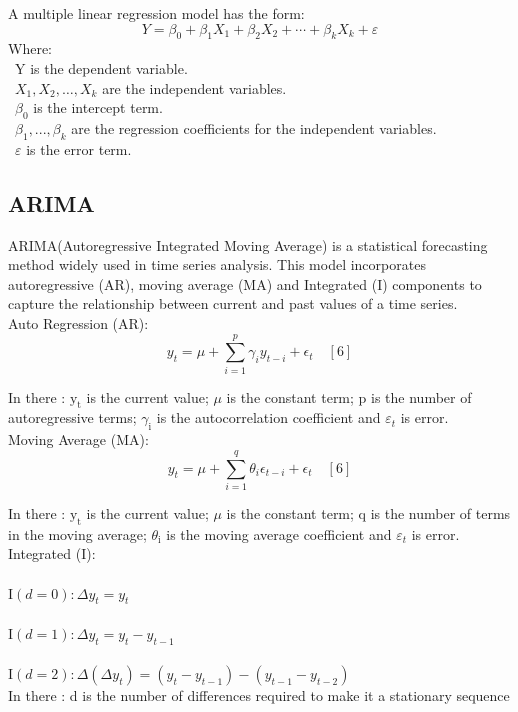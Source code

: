\documentclass{ieeeojies}
\begin{document}
A multiple linear regression model has the form: 
\[Y=\beta_0+\beta_1X_1+\beta_2X_2+\cdots+\beta_kX_k+\varepsilon\]
Where:\\
	\indent\textbullet\ Y is the dependent variable.\\
	\indent\textbullet\ \(X_1, X_2, \ldots, X_k\) are the independent variables.\\
	\indent\textbullet\ \(\beta_0\) is the intercept term.\\
	\indent\textbullet\ \(\beta_1,..., \beta_k\) are the regression coefficients for the independent variables.\\
	\indent\textbullet\ \(\varepsilon\) is the error term.
 \subsection{ARIMA}
 ARIMA(Autoregressive Integrated Moving Average) is a statistical forecasting method widely used in time series analysis. This model incorporates autoregressive (AR), moving average (MA) and Integrated (I) components to capture the relationship between current and past values of a time series.\\
Auto Regression (AR): 
$$
y_t=\mu+\sum_{i=1}^p \gamma_i y_{t-i}+\epsilon_t \quad [6]
$$

In there : $\mathrm{y}_{\mathrm{t}}$ is the current value; $\mu$ is the constant term; $\mathrm{p}$ is the number of autoregressive terms; $\gamma_{\mathrm{i}}$ is the autocorrelation coefficient and $\varepsilon_{t}$ is error.\\
Moving Average (MA):
$$
y_t=\mu+\sum_{i=1}^q \theta_i \epsilon_{t-i}+\epsilon_t \quad [6]
$$

In there : $\mathrm{y}_{\mathrm{t}}$ is the current value; $\mu$ is the constant term; $\mathrm{q}$ is the number of terms in the moving average; $\theta_{\mathrm{i}}$ is the moving average coefficient  and $\varepsilon_{t}$ is error.\\
Integrated (I):\\
 \\$\mathrm{I}(d=0): \Delta y_t=y_t$\\
 \\$\mathrm{I}(d=1): \Delta y_t=y_t-y_{t-1}$\\
 \\$\mathrm{I}(d=2): \Delta\left(\Delta y_t\right)=\left(y_t-y_{t-1}\right)-\left(y_{t-1}-y_{t-2}\right)$ \\
 
In there : d is the number of differences required to make it a stationary sequence 
\end{document}
